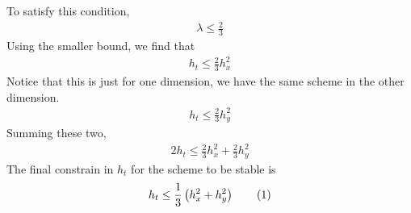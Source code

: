 \documentclass[11pt, letterpaper, hidelinks]{article}
\theoremstyle{definition}
\newcommand\numberthis{\addtocounter{equation}{1}\tag{\theequation}}
\begin{document}
To satisfy this condition,
\begin{align*}
    \lambda \le \frac{2}{3}
\end{align*}
Using the smaller bound, we find that
\begin{align*}
    h_t \le \frac{2}{3}h_x^2
\end{align*}
Notice that this is just for one dimension, we have the same scheme in the other dimension.
\begin{align*}
    h_t \le \frac{2}{3}h_y^2
\end{align*}
Summing these two,
\begin{align*}
    2h_t \le \frac{2}{3}h_x^2 + \frac{2}{3}h_y^2
\end{align*}
The final constrain in $h_t$ for the scheme to be stable is
\begin{align*}
    h_t \le \frac{1}{3} \left( h_x^2 + h_y^2 \right) \numberthis \label{ht}
\end{align*}
\end{document}
